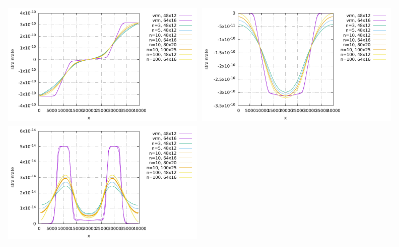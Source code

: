 





\begin{center}
\includegraphics[width=5cm]{python_codes/fieldstone_brick_regularised_plasticity/u_top.pdf}
\includegraphics[width=5cm]{python_codes/fieldstone_brick_regularised_plasticity/v_top.pdf}
\includegraphics[width=5cm]{python_codes/fieldstone_brick_regularised_plasticity/strainrate_top.pdf}
\end{center}


